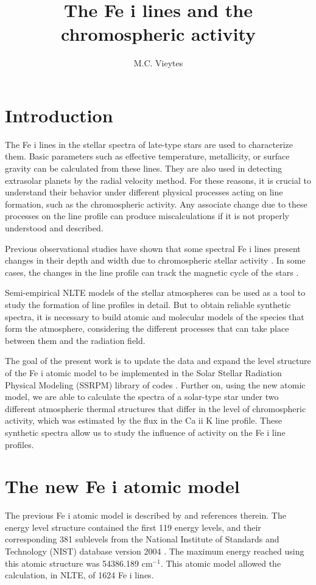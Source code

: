 \documentclass[baaa]{baaa}
\title{The Fe {\sc i} lines and the chromospheric activity}
\author{
M.C. Vieytes\inst{1}
}
\institute{
Instituto de Astronom{\'\i}a y F{\'\i}sica del Espacio, CONICET--UBA, Argentina
}
\begin{document}
\maketitle
\section{Introduction}\label{S_intro}
The Fe {\sc i} lines in the stellar spectra of late-type stars are used to characterize them. Basic parameters such as effective temperature, metallicity, or surface gravity can be calculated from these lines. They are also used in detecting extrasolar planets by the radial velocity method. For these reasons, it is crucial to understand their behavior under different physical processes acting on line formation, such as the chromospheric activity.  Any associate change due to these processes on the line profile can produce miscalculations if it is not properly understood and described. 

Previous observational studies have shown that some spectral Fe {\sc i} lines present changes in their depth and width due to chromospheric stellar activity \citep{wise18,spi20}. In some cases, the changes in the line profile can track the magnetic cycle of the stars \citep{liv07,flor16}.

Semi-empirical NLTE models of the stellar atmospheres can be used as a tool to study the formation of line profiles in detail. But to obtain reliable synthetic spectra, it is necessary to build atomic and molecular models of the species that form the atmosphere, considering the different processes that can take place between them and the radiation field. 

The goal of the present work is to update the data and expand the level structure of the Fe {\sc i} atomic model to be implemented in the Solar Stellar Radiation Physical Modeling ({\sc SSRPM}) library of codes \citep{fon15}. Further on, using the new atomic model, we are able to calculate the spectra of a solar-type star under two different atmospheric thermal structures that differ in the level of chromospheric activity, which was estimated by the flux in the Ca {\sc ii} K line profile. These synthetic spectra allow us to study the influence of activity on the Fe {\sc i} line profiles.


\section{The new Fe {\sc i} atomic model}
The previous Fe {\sc i} atomic model is described by \cite{fon15} and references therein. The energy level structure contained the first 119 energy levels, and their corresponding 381 sublevels from the National Institute of Standards and Technology (NIST) database version 2004 \citep{nist04}. The maximum energy reached using this atomic structure was 54386.189 cm$^{-1}$. This atomic model allowed the calculation, in NLTE, of 1624 Fe {\sc i} lines. 
\end{document}
